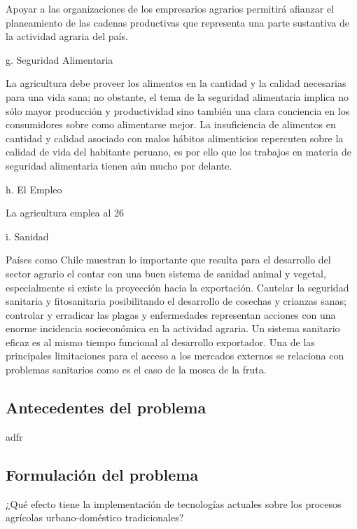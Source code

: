 \documentclass{report}
\begin{document}
Apoyar a las organizaciones de los empresarios agrarios permitirá afianzar el
planeamiento de las cadenas productivas que representa una parte sustantiva de
la actividad agraria del país.

g. Seguridad Alimentaria

La agricultura debe proveer los alimentos en la cantidad y la calidad necesarias para una vida sana; no obstante, el tema de la seguridad alimentaria implica no sólo mayor producción y productividad sino también una clara conciencia en los consumidores sobre como alimentarse mejor. La insuficiencia de alimentos en cantidad y calidad asociado con malos hábitos alimenticios repercuten sobre la calidad de vida del habitante peruano, es por ello que los trabajos en materia de seguridad alimentaria tienen aún mucho por delante.

h. El Empleo

La agricultura emplea al 26%

i. Sanidad

Países como Chile muestran lo importante que resulta para el desarrollo del
sector agrario el contar con una buen sistema de sanidad animal y vegetal,
especialmente si existe la proyección hacia la exportación. Cautelar la
seguridad sanitaria y fitosanitaria posibilitando el desarrollo de cosechas y
crianzas sanas; controlar y erradicar las plagas y enfermedades representan
acciones con una enorme incidencia socieconómica en la actividad agraria. Un
sistema sanitario eficaz es al mismo tiempo funcional al desarrollo exportador.
Una de las principales limitaciones para el acceso a los mercados externos se
relaciona con problemas sanitarios como es el caso de la mosca de la fruta.


\subsection{Antecedentes del problema}
adfr
\subsection{Formulación del problema}

¿Qué efecto tiene la implementación de tecnologías actuales sobre los procesos agrícolas urbano-doméstico tradicionales?
\end{document}
